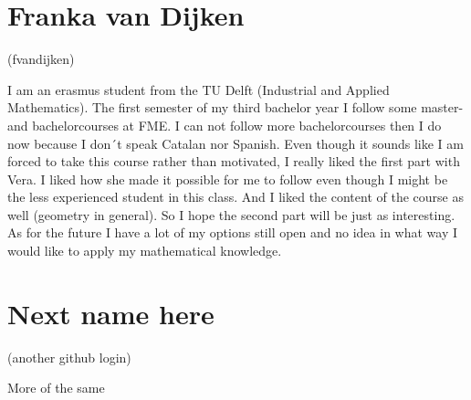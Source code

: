 \documentclass[11pt]{amsart}
\begin{document}
\medskip

\section*{Franka van Dijken}
(fvandijken)

I am an erasmus student from the TU Delft (Industrial and Applied Mathematics). The first semester of my third bachelor year I follow some master- and bachelorcourses at FME. I can not follow more bachelorcourses then I do now because I don´t speak Catalan nor Spanish. Even though it sounds like I am forced to take this course rather than motivated, I really liked the first part with Vera. I liked how she made it possible for me to follow even though I might be the less experienced student in this class. And I liked the content of the course as well (geometry in general). So I hope the second part will be just as interesting. 
As for the future I have a lot of my options still open and no idea in what way I would like to apply my mathematical knowledge.

\medskip

\section*{Next name here}
(another github login)

More of the same
\end{document}
